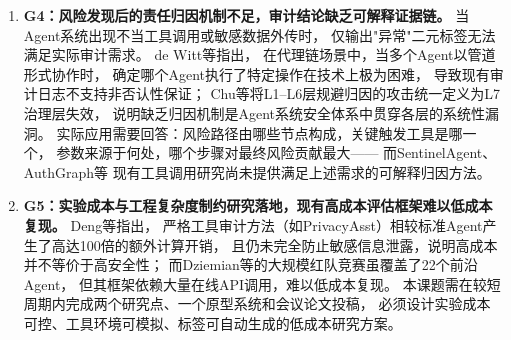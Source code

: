\begin{enumerate}
  \item \textbf{G4：风险发现后的责任归因机制不足，审计结论缺乏可解释证据链。}
  当Agent系统出现不当工具调用或敏感数据外传时，
  仅输出"异常"二元标签无法满足实际审计需求。
  de Witt等\cite{dewitt2026openchallenges}指出，
  在代理链场景中，当多个Agent以管道形式协作时，
  确定哪个Agent执行了特定操作在技术上极为困难，
  导致现有审计日志不支持非否认性保证；
  Chu等\cite{chu2026systematic}将L1--L6层规避归因的攻击统一定义为L7治理层失效，
  说明缺乏归因机制是Agent系统安全体系中贯穿各层的系统性漏洞。
  实际应用需要回答：风险路径由哪些节点构成，关键触发工具是哪一个，
  参数来源于何处，哪个步骤对最终风险贡献最大——
  而SentinelAgent\cite{he2025sentinelagent}、AuthGraph\cite{wang2026aligning}等
  现有工具调用研究尚未提供满足上述需求的可解释归因方法。

  \item \textbf{G5：实验成本与工程复杂度制约研究落地，现有高成本评估框架难以低成本复现。}
  Deng等\cite{deng2025agentsunderthreat}指出，
  严格工具审计方法（如PrivacyAsst）相较标准Agent产生了高达100倍的额外计算开销，
  且仍未完全防止敏感信息泄露，说明高成本并不等价于高安全性；
  而Dziemian等\cite{dziemian2026vulnerable}的大规模红队竞赛虽覆盖了22个前沿Agent，
  但其框架依赖大量在线API调用，难以低成本复现。
  本课题需在较短周期内完成两个研究点、一个原型系统和会议论文投稿，
  必须设计实验成本可控、工具环境可模拟、标签可自动生成的低成本研究方案。
\end{enumerate}
